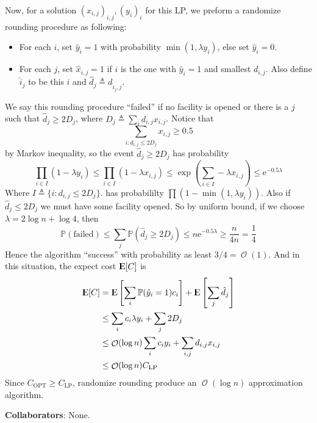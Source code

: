 \documentclass[12pt, a4paper]{article}
\newcommand{\defeq}{\triangleq}
\DeclareMathOperator*{\ord}{\mathcal{O}}
\begin{document}
Now, for a solution $(x_{i, j})_{i, j}, (y_i)_i$ for this LP, we preform a randomize rounding procedure
as following:
\newcommand*{\hx}{\hat{x}}
\newcommand*{\hy}{\hat{y}}
\begin{itemize}[itemsep=-5pt]
  \item For each $i$, set $\hat{y}_i = 1$ with probability $\min(1, \lambda y_i)$, else set $\hat{y}_i = 0$.
  \item For each $j$, set $\hx_{i, j} = 1$ if $i$ is the one with $\hy_i = 1$ and smallest $d_{i, j}$.
    Also define $\hat{i}_j$ to be this $i$ and $\hat{d}_j \defeq d_{\hat{i}_j, j}$.
\end{itemize}

\newcommand{\Expect}{{\rm I\kern-.3em E}}
We say this rounding procedure ``failed'' if no facility is opened or there is a $j$ such that
$\hat{d}_j \geq 2 D_j$, where $D_j \defeq \sum_i d_{i, j} x_{i, j}$.
Notice that
\[ \sum_{i: d_{i, j} \leq 2D_j} x_{i, j} \geq 0.5 \]
by Markov inequality, so the event $\hat{d}_j \geq 2 D_j$ has probability
\[ \prod_{i \in I} (1 - \lambda y_i)
  \leq \prod_{i \in I} (1 - \lambda x_{i, j})
  \leq \exp\left( \sum_{i \in I} - \lambda x_{i, j} \right)
  \leq \mathrm{e}^{-0.5 \lambda} \]
Where $I \defeq \{ i: d_{i, j} \leq 2D_j\}$.
has probabililty $\prod (1 - \min(1, \lambda y_i))$. Also if $\hat{d}_j \leq 2D_j$
we must have some facility opened. So by uniform bound, if we choose $\lambda = 2 \log n + \log 4$, then
\[ \mathbb{P}(\text{failed}) \leq \sum_{j} \mathbb{P}(\hat{d}_j \geq 2 D_j )
  \leq n \mathrm{e}^{-0.5 \lambda} \geq \frac{n}{4n} = \frac{1}{4} \]
Hence the algorithm ``success'' with probability as least $3 / 4 = \ord(1)$.
And in this situation, the expect cost $\Expect[C]$ is
\begin{align*}
  \Expect[C] &= \Expect\left[ \sum_i \mathbb{P}(\hat{y}_i = 1) c_i \right]
  + \Expect\left[ \sum_j \hat{d}_j \right] \\
  &\leq \sum_i c_i \lambda y_i + \sum_j 2 D_j  \\
  &\leq \ord(\log n) \sum_i c_i y_i + \sum_{i, j} d_{i, j} x_{i, j} \\
  &\leq \ord(\log n) C_{\text{LP}}
\end{align*}
Since $C_{\text{OPT}} \geq C_{\text{LP}}$, randomize rounding produce an $\ord(\log n)$ approximation
algorithm.

{\bf Collaborators}: None.
\end{document}
